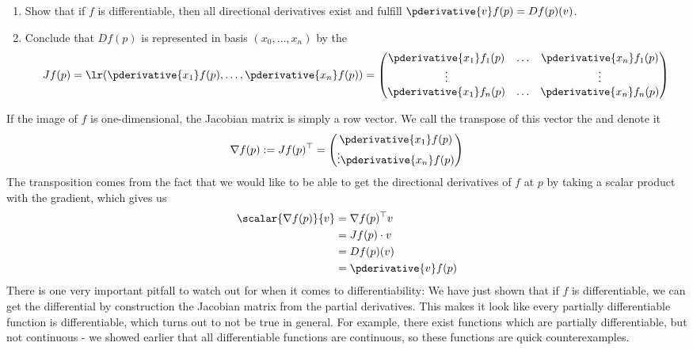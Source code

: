 \begin{exercise}
	\begin{enumerate}
		\item Show that if $f$ is differentiable, then all directional derivatives exist and fulfill $\pderivative{v} f(p) = Df(p)(v)$.
		\item Conclude that $Df(p)$ is represented in basis $(x_0, \hdots, x_n)$ by the 
		\begin{align*}
			Jf(p)
			=
			\lr(\pderivative{x_1} f(p), \hdots, \pderivative{x_n} f(p))
			=
			\begin{pmatrix}
				\pderivative{x_1}f_1(p) & \hdots & \pderivative{x_n}f_1(p)\\
				\vdots && \vdots\\
				\pderivative{x_1}f_n(p) & \hdots & \pderivative{x_n}f_n(p)
			\end{pmatrix}
		\end{align*}
	
	\end{enumerate}
\end{exercise}
If the image of $f$ is one-dimensional, the Jacobian matrix is simply a row vector. We call the transpose of this vector the  and denote it
\begin{align*}
	\nabla f(p)
	:=
	Jf(p)^\top
	=
	\begin{pmatrix}
		\pderivative{x_1} f(p)\\
		\vdots
		\pderivative{x_n} f(p)
	\end{pmatrix}
\end{align*}
The transposition comes from the fact that we would like to be able to get the directional derivatives of $f$ at $p$ by taking a scalar product with the gradient, which gives us
\begin{align*}
	\scalar{\nabla f(p)}{v} 
	&= \nabla f(p)^\top v\\ 
	&= Jf(p) \cdot v\\ 
	&= Df(p)(v)\\
	&= \pderivative{v} f(p)
\end{align*}
There is one very important pitfall to watch out for when it comes to differentiability: We have just shown that if $f$ is differentiable, we can get the differential by construction the Jacobian matrix from the partial derivatives. This makes it look like every partially differentiable function is differentiable, which turns out to not be true in general. 
\newpar
For example, there exist functions which are partially differentiable, but not continuous - we showed earlier that all differentiable functions are continuous, so these functions are quick counterexamples.
